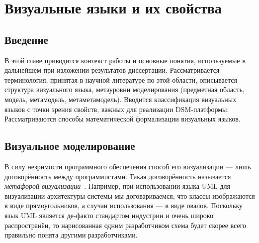 \chapter{Визуальные языки и их свойства}
\label{chapter1}

\section{Введение}
В этой главе приводится контекст работы и основные понятия, используемые в дальнейшем 
при изложении результатов диссертации. Рассматривается терминология, принятая в научной литературе 
по этой области, описывается структура визуального языка, метауровни моделирования (предметная область,
модель, метамодель, метаметамодель). Вводится классификация визуальных языков с точки зрения
свойств, важных для реализации DSM-платформы. Рассматриваются способы математической формализации
визуальных языков.

\section{Визуальное моделирование}
В силу незримости программного обеспечения способ его визуализации --- лишь договорённость
между программистами. Такая договорённость называется \textit{метафорой визуализации}~\cite{averbukh2001visualization, koznov2008osnovy}. 
Например, при использовании языка \ac{UML} для визуализации архитектуры системы мы 
договариваемся, что классы изображаются в виде прямоугольников, а случаи использования --- в виде овалов. 
Поскольку язык \ac{UML} является де-факто стандартом индустрии и очень широко 
распространён, то нарисованная одним разработчиком схема будет скорее всего 
правильно понята другими разработчиками.

